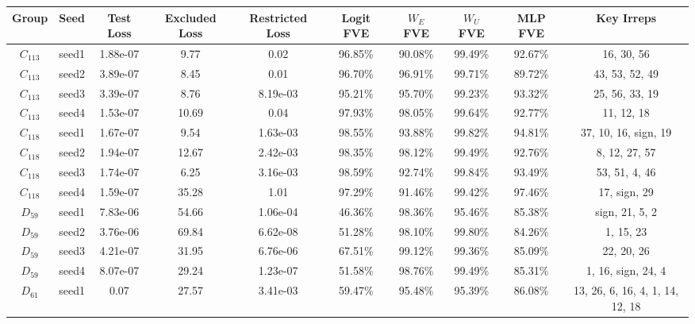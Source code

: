 \begin{tabular}{cccccccccc}
\toprule
    Group &  Seed & Test Loss & Excluded Loss & Restricted Loss & Logit FVE & $W_E$ FVE & $W_U$ FVE & MLP FVE &                      Key Irreps \\
\midrule
$C_{113}$ & seed1 &  1.88e-07 &          9.77 &            0.02 &   96.85\% &   90.08\% &   99.49\% & 92.67\% &                      16, 30, 56 \\
$C_{113}$ & seed2 &  3.89e-07 &          8.45 &            0.01 &   96.70\% &   96.91\% &   99.71\% & 89.72\% &                  43, 53, 52, 49 \\
$C_{113}$ & seed3 &  3.39e-07 &          8.76 &        8.19e-03 &   95.21\% &   95.70\% &   99.23\% & 93.32\% &                  25, 56, 33, 19 \\
$C_{113}$ & seed4 &  1.53e-07 &         10.69 &            0.04 &   97.93\% &   98.05\% &   99.64\% & 92.77\% &                      11, 12, 18 \\
$C_{118}$ & seed1 &  1.67e-07 &          9.54 &        1.63e-03 &   98.55\% &   93.88\% &   99.82\% & 94.81\% &            37, 10, 16, sign, 19 \\
$C_{118}$ & seed2 &  1.94e-07 &         12.67 &        2.42e-03 &   98.35\% &   98.12\% &   99.49\% & 92.76\% &                   8, 12, 27, 57 \\
$C_{118}$ & seed3 &  1.74e-07 &          6.25 &        3.16e-03 &   98.59\% &   92.74\% &   99.84\% & 93.49\% &                   53, 51, 4, 46 \\
$C_{118}$ & seed4 &  1.59e-07 &         35.28 &            1.01 &   97.29\% &   91.46\% &   99.42\% & 97.46\% &                    17, sign, 29 \\
 $D_{59}$ & seed1 &  7.83e-06 &         54.66 &        1.06e-04 &   46.36\% &   98.36\% &   95.46\% & 85.38\% &                  sign, 21, 5, 2 \\
 $D_{59}$ & seed2 &  3.76e-06 &         69.84 &        6.62e-08 &   51.28\% &   98.10\% &   99.80\% & 84.26\% &                       1, 15, 23 \\
 $D_{59}$ & seed3 &  4.21e-07 &         31.95 &        6.76e-06 &   67.51\% &   99.12\% &   99.36\% & 85.09\% &                      22, 20, 26 \\
 $D_{59}$ & seed4 &  8.07e-07 &         29.24 &        1.23e-07 &   51.58\% &   98.76\% &   99.49\% & 85.31\% &              1, 16, sign, 24, 4 \\
 $D_{61}$ & seed1 &      0.07 &         27.57 &        3.41e-03 &   59.47\% &   95.48\% &   95.39\% & 86.08\% & 13, 26, 6, 16, 4, 1, 14, 12, 18 \\

\end{tabular}
